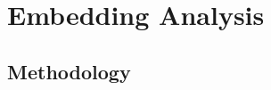 \documentclass[aspectratio=169, 12pt, compress]{beamer}
\begin{document}

    \section{Embedding Analysis}

    \subsection{Methodology}
\end{document}
